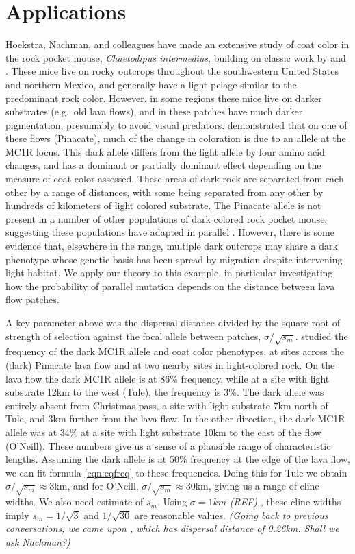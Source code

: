 \documentclass{article}
\newcommand{\gc}[1]{{\it\color{green}(#1)} }
\newcommand{\plr}[1]{{\it\color{blue}(#1)}}
\begin{document}
\section{Applications} 
Hoekstra, Nachman, and colleagues have made an extensive study of coat color in the rock pocket mouse, 
\emph{Chaetodipus intermedius}, building on classic work by \citet{benson1933concealing} and \citet{dice1940ecologic}.
These mice live on rocky outcrops throughout the southwestern United States and northern Mexico, 
and generally have a light pelage similar to the predominant rock color.
However, in some regions these mice live on darker substrates (e.g.\ old lava flows),
and in these patches have much darker pigmentation, 
presumably to avoid visual predators.
\citet{nachman2003different} demonstrated that on one of these flows (Pinacate), 
much of the change in coloration is due to an allele at the MC1R locus.
This dark allele differs from the light allele by four amino acid changes, 
and has a dominant or partially dominant effect depending on the measure of coat color assessed. 
These areas of dark rock are separated from each other by a range of distances, 
with some being separated from any other by hundreds of kilometers of light colored substrate. 
The Pinacate allele is not present in a number of other populations of dark colored rock pocket mouse, 
suggesting these populations have adapted in parallel \citep{xxx}.
However, there is some evidence \citep{Hoekstra:05} that, elsewhere in the range, 
multiple dark outcrops may share a dark phenotype whose genetic basis has been spread by migration
despite intervening light habitat. 
We apply our theory to this example,
in particular investigating how the probability of parallel mutation depends on 
the distance between lava flow patches.

A key parameter above was the dispersal distance divided by the square root of strength of selection against the focal allele between patches, $\sigma/\sqrt{s_m}$. \citep{hoekstra2004ecological} studied the frequency of the dark MC1R allele and coat color phenotypes, 
at sites across the (dark) Pinacate lava flow and at two nearby sites in light-colored rock.
On the lava flow the dark MC1R allele is at 86\% frequency,
while at a site with light substrate 12km to the west (Tule), the frequency is 3\%.
The dark allele was entirely absent from Christmas pass, a site with light substrate 7km north of Tule, and 3km further from the lava flow.
In the other direction, the dark MC1R allele was at 34\% at a site with light substrate 10km to the east of the flow (O'Neill).
These numbers give us a sense of a plausible range of characteristic lengths.
Assuming the dark allele is at 50\% frequency at the edge of the lava flow, 
we can fit formula \eqref{eqn:eqfreq} to these frequencies.
Doing this for Tule we obtain $\sigma/\sqrt{s_m} \approx 3$km, 
and for O'Neill, $\sigma/\sqrt{s_m} \approx 30$km, giving us a range of cline widths. 
We also need estimate of $s_m$. 
Using $\sigma=1km$ \gc{REF}, these cline widths imply $s_m=1/\sqrt{3}$ and
$1/\sqrt{30}$ are reasonable values.
\plr{Going back to previous conversations, we came upon \citet{mullen2008natural}, 
which has dispersal distance of 0.26km.  Shall we ask Nachman?}
\end{document}
